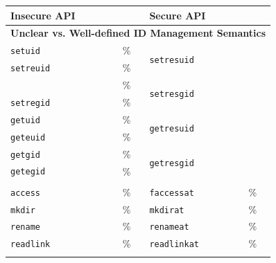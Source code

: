 \begin{table}[t!b!]
\footnotesize
\centering
\begin{tabular}{m{1.2in}>{\raggedleft\arraybackslash}m{1.2in}m{1.2in}>{\raggedleft\arraybackslash}m{1.2in}}
\toprule
{\bf Insecure API} & {\bf \UnwusageMetric{}} & {\bf Secure API} & {\bf \Unwusagemetric{}}\\
\midrule
\multicolumn{4}{c}{\bf Unclear vs. Well-defined ID Management Semantics} \\
\midrule
\addlinespace
{\tt setuid}   & 15.67\% & \multirow{2}{*}{\tt setresuid} & \multirow{2}{*}{99.68\%} \\
{\tt setreuid} &  1.88\% & & \\
\addlinespace {\tt setgid}   & 12.07\% & \multirow{2}{*}{\tt setresgid} & \multirow{2}{*}{99.68\%} \\
{\tt setregid} &  1.24\% & & \\
\addlinespace
{\tt getuid}   & 99.81\% & \multirow{2}{*}{\tt getresuid} & \multirow{2}{*}{36.19\%} \\
{\tt geteuid}  & 55.15\% & & \\
\addlinespace
{\tt getgid}   & 99.81\% & \multirow{2}{*}{\tt getresgid} & \multirow{2}{*}{36.14\%} \\
{\tt getegid}  & 48.87\% & & \\
\addlinespace
\midrule
\multicolumn{4}{c}{\bf Nonatomic vs. Atomic Directory operations} \\
\midrule
{\tt access}   & 74.24\% & {\tt faccessat}  & 0.63\% \\
\addlinespace
{\tt mkdir}    & 52.07\% & {\tt mkdirat}    & 0.34\% \\
{\tt rename}   & 43.18\% & {\tt renameat}   & 0.30\% \\
{\tt readlink} & 46.38\% & {\tt readlinkat} & 0.50\% \\
\addlinespace

\end{tabular}
\end{table}
